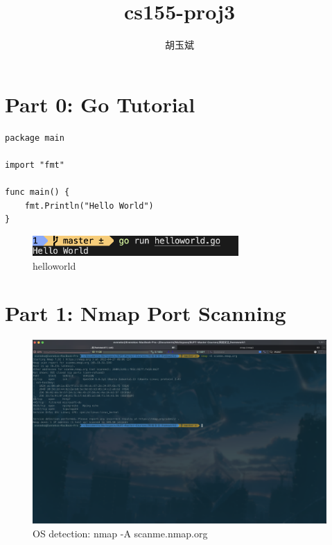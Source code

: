 \documentclass[onecolumn,oneside]{BUPTHomework}
\author{胡玉斌}
\title{cs155-proj3}
\begin{document}
  \maketitle

  \section*{Part 0: Go Tutorial}

  
  \begin{lstlisting}
package main

import "fmt"

func main() {
    fmt.Println("Hello World")
}
  \end{lstlisting}

  \begin{figure}[h]
    \centering
    \includegraphics[width=0.70\textwidth]{img/fig1.png}
    \caption{helloworld}
    \label{fig1}
  \end{figure}
  
  \section*{Part 1: Nmap Port Scanning}

  \begin{figure}[h]
    \centering
    \includegraphics[width=1.00\textwidth]{img/fig2.png}
    \caption{OS detection: nmap -A scanme.nmap.org}
    \label{fig2}
  \end{figure}
\end{document}
